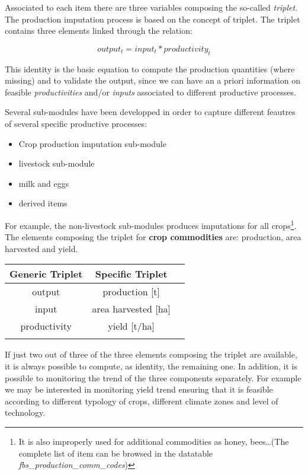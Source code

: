 \documentclass[nojss]{jss}
\newcommand{\head}[1]{\textnormal{\textbf{#1}}}
\begin{document}
Associated to each item there are three variables composing the so-called \textit{triplet}. 
The production imputation process is based on the concept of triplet. The triplet contains three elements linked through the relation:

\begin{dmath*}
output_{t}= input_{t} * productivity_{t}
\end{dmath*}


This identity is the basic equation to compute the production quantities (where missing) and to validate the output, since we can have an a priori information on feasible \textit{productivities} and/or \textit{inputs} associated to different productive processes.

Several sub-modules have been developped in order to capture different feautres of several specific productive processes:

\begin{itemize}
\item Crop production imputation sub-module
\item livestock sub-module
\item milk and eggs 
\item derived items
\end{itemize}




For example, the non-livestock sub-modules produces imputations for all crops\footnote{It is also improperly used for additional commodities as honey, bees\dots (The complete list of item can be browsed in the datatable \textit{fbs_production_comm_codes})}. The elements composing the triplet for \textbf{crop commodities} are: production, area harvested and yield.

\bigskip

\begin{tabular}{ccc}
  \toprule[1.5pt]
  \head{Generic Triplet} & \head{Specific Triplet} \\
  \midrule
  output       & production [t]      \\
  input        & area harvested [ha] \\
  productivity & yield [t/ha]        \\
  \bottomrule[1.5pt]
  \caption{\textit{Crop Item Production Triplet}}
\end{tabular}

\bigskip


If just two out of three of the three elements composing the triplet are available, it is always possible to compute, as identity, the remaining one. In addition, it is possible to monitoring the trend of the three components separately. For example we may be interested in monitoring yield trend ensuring that it is feasible according to different typology of crops, different climate zones and level of technology.
\end{document}
